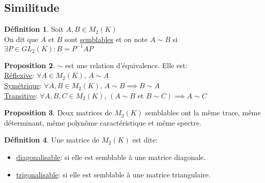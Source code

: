 \documentclass[10pt,a4paper]{article}
\theoremstyle{definition}
\newtheorem{proposition}{Proposition}[section]
\newtheorem{definition}[proposition]{Définition}
\begin{document}
\subsection{Similitude}
\begin{definition}
Soit $A, B \in M_2(K)$ \\
On dit que $A$ et $B$ sont \uline{semblables} et on note $A \sim B$ si $\exists P \in GL_2(K): B = P^{-1}AP$
\end{definition}
\begin{proposition}
$\sim$ est une relation d'équivalence. Elle est: \\
\uline{Réflexive}: $\forall A \in M_2(K)$, $A \sim A$ \\
\uline{Symétrique}: $\forall A, B \in M_2(K)$, $A \sim B \implies B \sim A$ \\
\uline{Transitive}: $\forall A, B, C \in M_2(K)$, $(A \sim B \text{ et } B \sim C) \implies A \sim C$
\end{proposition}
\begin{proposition}
Deux matrices de $M_2(K)$ semblables ont la même trace, même déterminant, même polynôme caractéristique et même spectre.
\end{proposition}
\begin{definition}
Une matrice de $M_2(K)$ est dite:
\begin{itemize}
\item \uline{diagonalisable}: si elle est semblable à une matrice diagonale.
\item \uline{trigonalisable}: si elle est semblable à une matrice triangulaire.
\end{itemize}
\end{definition}
\end{document}
